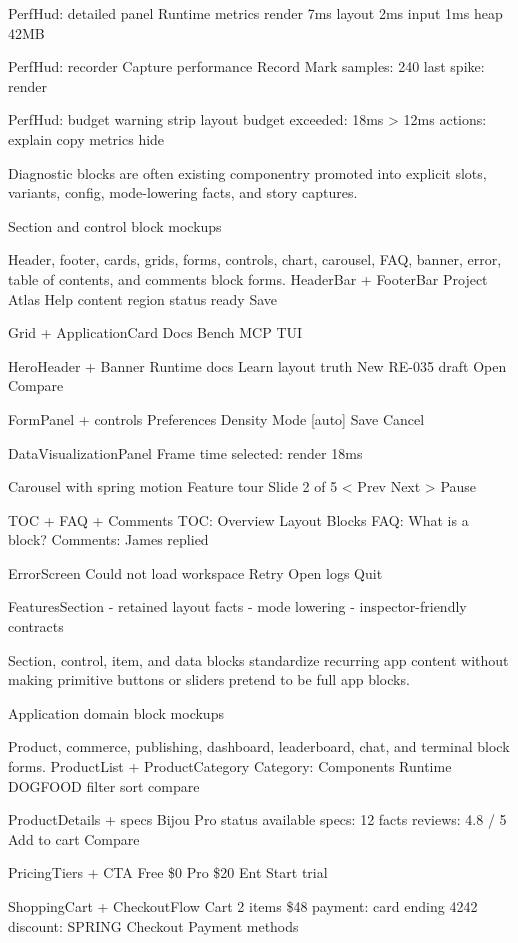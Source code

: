 PerfHud: detailed panel Runtime metrics render 7ms layout 2ms input 1ms heap 42MB

PerfHud: recorder Capture performance Record Mark samples: 240 last spike: render

PerfHud: budget warning strip layout budget exceeded: 18ms \textgreater{} 12ms actions: explain copy metrics hide

Diagnostic blocks are often existing componentry promoted into explicit slots, variants, config, mode-lowering facts, and story captures.

Section and control block mockups

Header, footer, cards, grids, forms, controls, chart, carousel, FAQ, banner, error, table of contents, and comments block forms. HeaderBar + FooterBar Project Atlas Help content region status ready Save

Grid + ApplicationCard Docs Bench MCP TUI

HeroHeader + Banner Runtime docs Learn layout truth New RE-035 draft Open Compare

FormPanel + controls Preferences Density Mode {[}auto{]} Save Cancel

DataVisualizationPanel Frame time selected: render 18ms

Carousel with spring motion Feature tour Slide 2 of 5 \textless{} Prev Next \textgreater{} Pause

TOC + FAQ + Comments TOC: Overview Layout Blocks FAQ: What is a block? Comments: James replied

ErrorScreen Could not load workspace Retry Open logs Quit

FeaturesSection - retained layout facts - mode lowering - inspector-friendly contracts

Section, control, item, and data blocks standardize recurring app content without making primitive buttons or sliders pretend to be full app blocks.

Application domain block mockups

Product, commerce, publishing, dashboard, leaderboard, chat, and terminal block forms. ProductList + ProductCategory Category: Components Runtime DOGFOOD filter sort compare

ProductDetails + specs Bijou Pro status available specs: 12 facts reviews: 4.8 / 5 Add to cart Compare

PricingTiers + CTA Free \$0 Pro \$20 Ent Start trial

ShoppingCart + CheckoutFlow Cart 2 items \$48 payment: card ending 4242 discount: SPRING Checkout Payment methods

